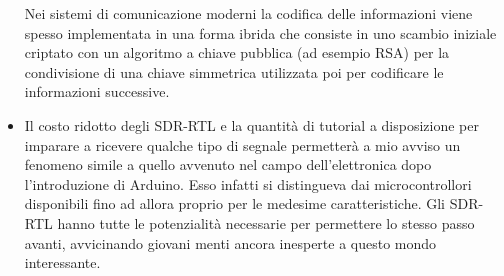 \begin{itemize}
 Nei sistemi di comunicazione moderni la codifica delle informazioni viene spesso implementata in una forma ibrida che consiste in uno scambio iniziale criptato con un algoritmo a chiave pubblica (ad esempio RSA) per la condivisione di una chiave simmetrica utilizzata poi per codificare le informazioni successive.
 \item  Il costo ridotto degli SDR-RTL e la quantità di tutorial a disposizione per imparare a ricevere qualche tipo di segnale permetterà a mio avviso un fenomeno simile a quello avvenuto nel campo dell'elettronica dopo l'introduzione di Arduino. Esso infatti si distingueva dai microcontrollori disponibili fino ad allora proprio per le medesime caratteristiche. Gli SDR-RTL hanno tutte le potenzialità necessarie per permettere lo stesso passo avanti, avvicinando giovani menti ancora inesperte a questo mondo interessante.
\end{itemize}


